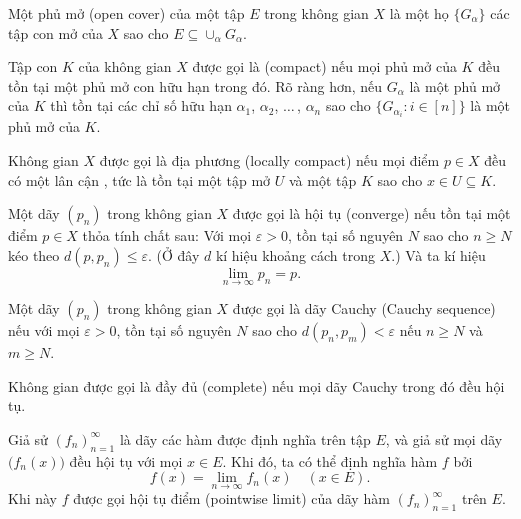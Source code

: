 \begin{defn}[Phủ mở]
  Một phủ mở (open cover) của một tập $E$ trong không gian  $X$ là
  một họ $\{G_\alpha\}$ các tập con mở của $X$ sao cho $E \subseteq \cup_\alpha
  G_\alpha$.
\end{defn}

\begin{defn}
  Tập con $K$ của không gian  $X$ được gọi là  (compact)
  nếu mọi phủ mở của $K$ đều tồn tại một phủ mở con hữu hạn trong đó. Rõ ràng
  hơn, nếu ${G_\alpha}$ là một phủ mở của $K$ thì tồn tại các chỉ số hữu hạn
  $\alpha_1$, $\alpha_2$, $\ldots\,$, $\alpha_n$ sao cho $\{G_{\alpha_i} \colon
  i \in [n]\}$ là một phủ mở của $K$.
\end{defn}

\begin{defn}
  Không gian  $X$ được gọi là  địa phương (locally
  compact) nếu mọi điểm $p \in X$ đều có một lân cận , tức là tồn
  tại một tập mở $U$ và một tập  $K$ sao cho $ x\in U \subseteq K$.
\end{defn}

\begin{defn}
  Một dãy $(p_n)$ trong không gian  $X$ được gọi là hội tụ
  (converge) nếu tồn tại một điểm $p \in X$ thỏa tính chất sau: Với mọi
  $\varepsilon > 0$, tồn tại số nguyên $N$ sao cho $n \ge N$ kéo theo $d(p,
  p_n) \le \varepsilon$. (Ở đây $d$ kí hiệu khoảng cách trong $X$.) Và ta kí
  hiệu \begin{equation}
    \lim_{n\to\infty} p_n = p.
  \end{equation}
\end{defn}

\begin{defn}
  Một dãy $(p_n)$ trong không gian  $X$ được gọi là dãy Cauchy
  (Cauchy sequence) nếu với mọi $\varepsilon > 0$, tồn tại số nguyên $N$ sao
  cho $d(p_n, p_m) < \varepsilon$ nếu $n \ge N$ và $m \ge N$.
\end{defn}

\begin{defn}
  Không gian  được gọi là đầy đủ (complete) nếu mọi dãy Cauchy trong
  đó đều hội tụ.
\end{defn}

\begin{defn}
  Giả sử $(f_n)_{n = 1}^\infty$ là dãy các hàm được định nghĩa trên tập $E$, và
  giả sử mọi dãy $\bigl( f_n(x) \bigr )$ đều hội tụ với mọi $x \in E$. Khi đó,
  ta có thể định nghĩa hàm $f$ bởi \begin{equation}
    f(x) = \lim_{n\to \infty} f_n(x) \quad (x \in E).
  \end{equation} Khi này $f$ được gọi hội tụ điểm  (pointwise limit) của dãy
  hàm $(f_n)_{n = 1}^\infty$ trên $E$.
\end{defn}

